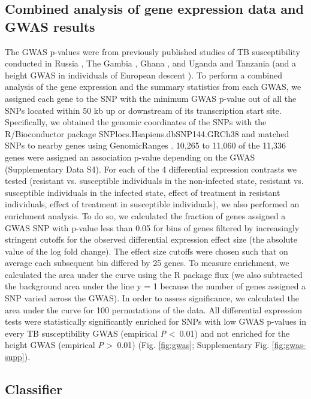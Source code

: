 \documentclass[fleqn,10pt]{wlscirep}
\begin{document}
\subsection*{Combined analysis of gene expression data and GWAS results}

The GWAS p-values were from previously published studies of TB
susceptibility conducted in Russia \cite{Curtis2015}, The Gambia
\cite{Thye2010}, Ghana \cite{Thye2010}, and Uganda and Tanzania
\cite{Sobota2016} (and a height GWAS in individuals of European
descent \cite{LangoAllen2010}). To perform a combined analysis of the
gene expression and the summary statistics from each GWAS, we assigned
each gene to the SNP with the minimum GWAS p-value out of all the SNPs
located within 50 kb up or downstream of its transcription start site.
Specifically, we obtained the genomic coordinates of the SNPs with the
R/Bioconductor \cite{Huber2015} package
SNPlocs.Hsapiens.dbSNP144.GRCh38 and matched SNPs to nearby genes
using GenomicRanges \cite{Lawrence2013}. 10,265 to 11,060 of the
11,336 genes were assigned an association p-value depending on the
GWAS (Supplementary Data S4). For each of the 4 differential
expression contrasts we tested (resistant vs. susceptible individuals
in the non-infected state, resistant vs. susceptible individuals in
the infected state, effect of treatment in resistant individuals,
effect of treatment in susceptible individuals), we also performed an
enrichment analysis. To do so, we calculated the fraction of genes
assigned a GWAS SNP with p-value less than 0.05 for bins of genes
filtered by increasingly stringent cutoffs for the observed
differential expression effect size (the absolute value of the log
fold change). The effect size cutoffs were chosen such that on average
each subsequent bin differed by 25 genes. To measure enrichment, we
calculated the area under the curve using the R package flux
\cite{Jurasinski2014} (we also subtracted the background area under
the line y = 1 because the number of genes assigned a SNP varied
across the GWAS). In order to assess significance, we calculated the
area under the curve for 100 permutations of the data. All
differential expression tests were statistically significantly
enriched for SNPs with low GWAS p-values in every TB susceptibility
GWAS (empirical \emph{P} \textless \, 0.01) and not enriched for the
height GWAS (empirical \emph{P} \textgreater \, 0.01) (Fig.
\ref{fig:gwas}; Supplementary Fig. \ref{fig:gwas-supp}).
\subsection*{Classifier}
\end{document}
